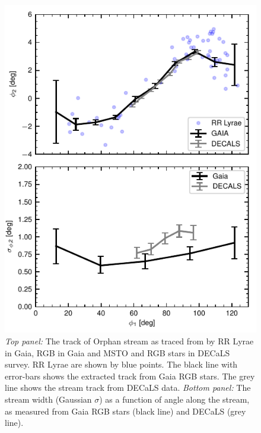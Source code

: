 \documentclass[a4paper,useAMS,usenatbib]{mnras}
\begin{document}
%
\begin{figure}
  \centering \includegraphics{gaia_fit_plot2.pdf}
  \caption[]{{\it Top panel:} The track of Orphan stream as traced
    from by RR Lyrae in Gaia, RGB in Gaia and MSTO and RGB stars in
    DECaLS survey. RR Lyrae are shown by blue points. The black line
    with error-bars shows the extracted track from Gaia RGB stars. The
    grey line shows the stream track from DECaLS data. {\it Bottom
      panel:} The stream width (Gaussian $\sigma$) as a function of
    angle along the stream, as measured from Gaia RGB stars (black
    line) and DECaLS (grey line). }
   \label{fig:compare_track}
\end{figure}
%
\end{document}
